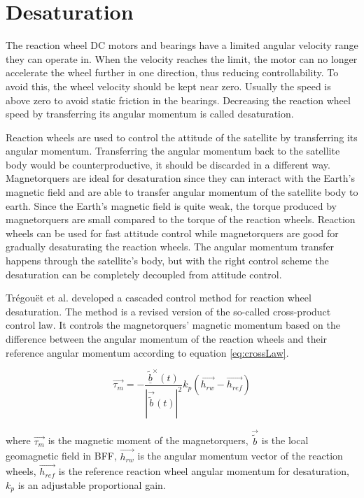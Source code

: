 \section{Desaturation}

The reaction wheel DC motors and bearings have a limited angular velocity range they can operate in. When the velocity reaches the limit, the motor can no longer accelerate the wheel further in one direction, thus reducing controllability. To avoid this, the wheel velocity should be kept near zero. Usually the speed is above zero to avoid static friction in the bearings. Decreasing the reaction wheel speed by transferring its angular momentum is called desaturation.

Reaction wheels are used to control the attitude of the satellite by transferring its angular momentum. Transferring the angular momentum back to the satellite body would be counterproductive, it should be discarded in a different way. Magnetorquers are ideal for desaturation since they can interact with the Earth's magnetic field and are able to transfer angular momentum of the satellite body to earth. Since the Earth's magnetic field is quite weak, the torque produced by magnetorquers are small compared to the torque of the reaction wheels. Reaction wheels can be used for fast attitude control while magnetorquers are good for gradually desaturating the reaction wheels. The angular momentum transfer happens through the satellite's body, but with the right control scheme the desaturation can be  completely decoupled from attitude control.

Trégouët et al. \cite{DesatTregouet} developed a cascaded control method for reaction wheel desaturation. The method is a revised version of the so-called cross-product control law. It controls the magnetorquers' magnetic momentum based on the difference between the angular momentum of the reaction wheels and their reference angular momentum according to equation \ref{eq:crossLaw}.

\begin{equation}
\label{eq:crossLaw}
\vec{\tau_m} = -\frac{\underline{\tilde{b}}^\times(t)}{|\vec{\tilde{b}}(t) |^2} k_p\left(\vec{h_{rw}} - \vec{h_{ref}} \right)
\end{equation}

where $\vec{\tau_m}$ is the magnetic moment of the magnetorquers, $\vec{\tilde{b}}$ is the local geomagnetic field in BFF, $\vec{h_{rw}}$ is the angular momentum vector of the reaction wheels, $\vec{h_{ref}}$ is the reference reaction wheel angular momentum for desaturation, $k_p$ is an adjustable proportional gain.
		
